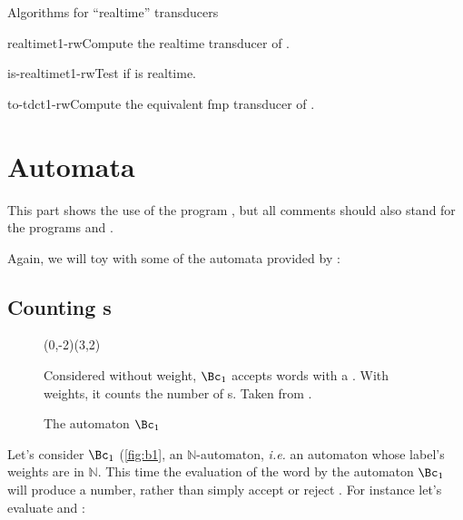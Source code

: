 \begin{fnsection}{Algorithms for ``realtime'' transducers}
\item{realtime}{t1-rw}{Compute the realtime transducer of  .}
\item{is-realtime}{t1-rw}{Test if  is realtime.}
\item{to-tdc}{t1-rw}{Compute the equivalent fmp transducer of .}
\hline
\end{fnsection}

\newpage
\section{\Z Automata}
\label{sec:vcsn-z}

This part shows the use of the program , but
all comments should also stand for the programs
 and .

Again, we will toy with some of the automata provided by
:

\subsection{Counting s}

\begin{figure}[tp] \centering
  \begin{VCPicture}{(0,-2)(3,2)}
     
  \end{VCPicture}
  \begin{legend}
    Considered without weight, $\Bc_1$ accepts words with a
    .  With weights, it counts the number of s.  Taken
    from \citet[Fig. III.2.2, p.
    434]{sakarovitch.03.eta}.
  \end{legend}
  \caption{The automaton $\Bc_1$}
  \label{fig:b1}
\end{figure}

Let's consider $\Bc_1$ (\autoref{fig:b1}, an
$\mathbb{N}$-automaton,
\textit{i.e.}  an automaton whose label's weights are in $\mathbb{N}$.
This time the evaluation of the word  by the automaton
$\Bc_1$ will produce a number, rather than simply accept or
reject .  For instance let's evaluate  and
:

